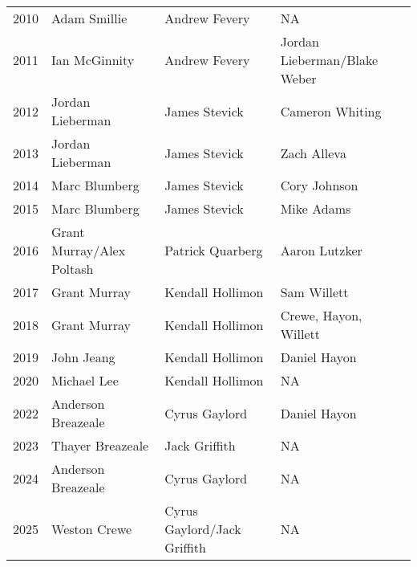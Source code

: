 \begin{table}[H]
{\begin{tabular}{c l l l}
2010 & Adam Smillie & Andrew Fevery & NA \\
2011 & Ian McGinnity & Andrew Fevery & Jordan Lieberman/Blake Weber \\
2012 & Jordan Lieberman & James Stevick & Cameron Whiting \\
2013 & Jordan Lieberman & James Stevick & Zach Alleva \\
2014 & Marc Blumberg & James Stevick & Cory Johnson \\
2015 & Marc Blumberg & James Stevick & Mike Adams \\
2016 & Grant Murray/Alex Poltash & Patrick Quarberg & Aaron Lutzker \\
2017 & Grant Murray & Kendall Hollimon & Sam Willett \\
2018 & Grant Murray & Kendall Hollimon & Crewe, Hayon, Willett \\
2019 & John Jeang & Kendall Hollimon & Daniel Hayon \\
2020 & Michael Lee & Kendall Hollimon & NA \\
2022 & Anderson Breazeale & Cyrus Gaylord & Daniel Hayon \\
2023 & Thayer Breazeale & Jack Griffith & NA \\
2024 & Anderson Breazeale & Cyrus Gaylord & NA \\
2025 & Weston Crewe & Cyrus Gaylord/Jack Griffith & NA \\
\bottomrule
\end{tabular}%
}
\end{table}


